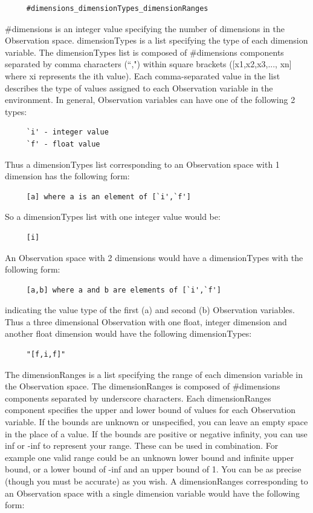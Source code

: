 \documentclass[11pt]{article}
\begin{document}
\begin{verbatim}        
     #dimensions_dimensionTypes_dimensionRanges
\end{verbatim}
\#dimensions is an integer value specifying the number of dimensions in the Observation space. dimensionTypes is a list specifying the type of each dimension variable. The dimensionTypes list is composed of \#dimensions components separated by comma characters (``,") within square brackets ([x1,x2,x3,..., xn] where xi  represents the ith value). Each comma-separated value in the list describes the type of values assigned to each Observation variable in the environment. In general, Observation variables can have one of the following 2 types:
\begin{verbatim}
     `i' - integer value
     `f' - float value
\end{verbatim}
Thus a dimensionTypes list corresponding to an Observation space with 1 dimension has the following form:
\begin{verbatim}
     [a] where a is an element of [`i',`f']
\end{verbatim}
So a dimensionTypes list with one integer value would be:    
\begin{verbatim}    
     [i]
\end{verbatim}     
An Observation space with 2 dimensions would have a dimensionTypes with the following form:
\begin{verbatim}
     [a,b] where a and b are elements of [`i',`f']
\end{verbatim}
indicating the value type of the first (a) and second (b) Observation variables. Thus a three dimensional Observation with one float, integer dimension and another float dimension would have the following dimensionTypes:
\begin{verbatim}
     "[f,i,f]"
\end{verbatim}
The dimensionRanges is a list specifying the range of each dimension variable in the Observation space.  The dimensionRanges is composed of \#dimensions components separated by underscore characters. Each dimensionRanges component specifies the upper and lower bound of values for each Observation variable. If the bounds are unknown or unspecified, you can leave an empty space in the place of a value. If the bounds are positive or negative infinity, you can use inf or -inf to represent your range. These can be used in combination. For example one valid range could be an unknown lower bound and infinite upper bound, or a lower bound of -inf and an upper bound of 1. You can be as precise (though you must be accurate) as you wish. A dimensionRanges corresponding to an Observation space with a single dimension variable would have the following form:
\end{document}
